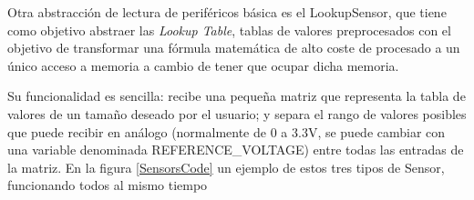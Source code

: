 \documentclass{report}
\begin{document}
\par \vspace{0.3cm}
Otra abstracción de lectura de periféricos básica es el LookupSensor, que tiene como objetivo abstraer las \textit{Lookup Table}, tablas de valores preprocesados con el objetivo de transformar una fórmula matemática de alto coste de procesado a un único acceso a memoria a cambio de tener que ocupar dicha memoria. \par
Su funcionalidad es sencilla: recibe una pequeña matriz que representa la tabla de valores de un tamaño deseado por el usuario; y separa el rango de valores posibles que puede recibir en análogo (normalmente de 0 a 3.3V, se puede cambiar con una variable denominada REFERENCE\_VOLTAGE) entre todas las entradas de la matriz. En la figura \ref{SensorsCode} un ejemplo de estos tres tipos de Sensor, funcionando todos al mismo tiempo
\end{document}
